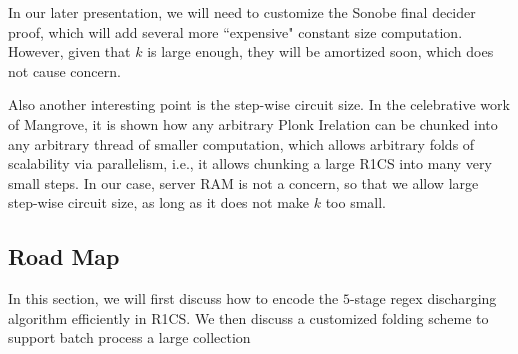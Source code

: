In our later presentation, we will need to customize the Sonobe final decider
proof, which will add several more ``expensive" constant size computation. 
However, given that $k$ is large enough, they will be amortized soon, which
does not cause concern. 

Also another interesting point is the step-wise circuit size.
In the celebrative work of Mangrove, it is shown how any arbitrary Plonk
Irelation can be chunked into any arbitrary thread of smaller computation,
which allows arbitrary folds of scalability via parallelism, i.e.,
it allows chunking a large R1CS into many very small steps.
In our case, server RAM is not a concern, so that we allow large
step-wise circuit size, as long as it does not make $k$ too small.

\subsection{Road Map}
In this section, we will first discuss how to encode the $5$-stage 
regex discharging algorithm efficiently in R1CS. We then discuss a 
customized folding scheme to support batch process a large collection
